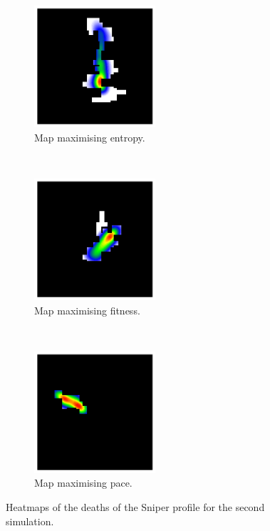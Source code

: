 \begin{figure}[H]
    \centering
    \begin{subfigure}[t]{0.3\textwidth}
        \centering
        \includegraphics[height=4.5cm]{Images/images/experiment_two/best_entropy_pop_1/deaths_bot_1.png}
        \caption{Map maximising entropy.}
    \end{subfigure}%
    ~ 
    \begin{subfigure}[t]{0.3\textwidth}
        \centering
        \includegraphics[height=4.5cm]{Images/images/experiment_two/best_fitness_pop_1/deaths_bot_1.png}
        \caption{Map maximising fitness.}
    \end{subfigure}
    ~ 
    \begin{subfigure}[t]{0.3\textwidth}
        \centering
        \includegraphics[height=4.5cm]{Images/images/experiment_two/best_pace_pop_1/deaths_bot_1.png}
        \caption{Map maximising pace.}
    \end{subfigure}
    \caption{Heatmaps of the deaths of the Sniper profile for the second simulation.}
\end{figure}
